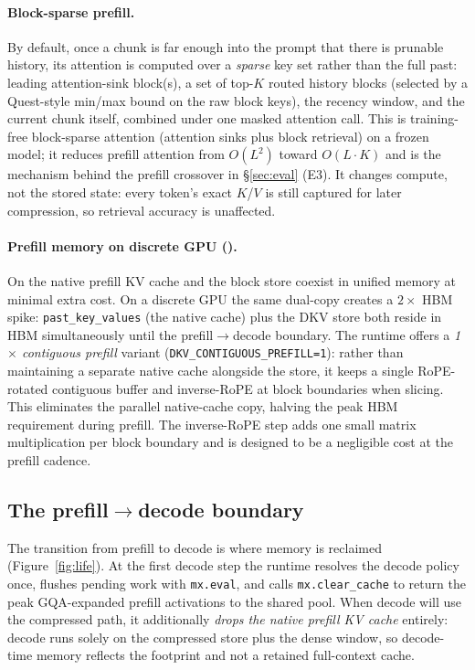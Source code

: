 \paragraph{Block-sparse prefill.} By default, once a chunk is far enough into the prompt that
there is prunable history, its attention is computed over a \emph{sparse} key set rather than the
full past: leading attention-sink block(s), a set of top-$K$ routed history blocks (selected by a
Quest-style min/max bound on the raw block keys), the recency window, and the current chunk itself,
combined under one masked attention call. This is training-free block-sparse attention
(attention sinks plus block retrieval) on a frozen model; it reduces prefill attention from
$O(L^2)$ toward $O(L\cdot K)$ and is the mechanism behind the prefill crossover in
\S\ref{sec:eval} (E3). It changes compute, not the stored state: every token's exact $K$/$V$ is
still captured for later compression, so retrieval accuracy is unaffected.

\paragraph{Prefill memory on discrete GPU (\cuda{}).}
On \mlxe{} the native prefill KV cache and the \dkv{} block store coexist in unified memory
at minimal extra cost. On a discrete GPU the same dual-copy creates a $2\times$ HBM spike:
\texttt{past\_key\_values} (the native cache) plus the DKV store both reside in HBM
simultaneously until the prefill$\to$decode boundary. The \cuda{} runtime offers a
\emph{1$\times$ contiguous prefill} variant (\texttt{DKV\_CONTIGUOUS\_PREFILL=1}): rather than
maintaining a separate native cache alongside the store, it keeps a single RoPE-rotated
contiguous buffer and inverse-RoPE at block boundaries when slicing. This eliminates the parallel
native-cache copy, halving the peak HBM requirement during prefill. The inverse-RoPE step adds
one small matrix multiplication per block boundary and is designed to be a negligible cost at
the prefill cadence.

\subsection{The prefill$\to$decode boundary}
The transition from prefill to decode is where memory is reclaimed (Figure~\ref{fig:life}). At the
first decode step the runtime resolves the decode policy once, flushes pending work with
\texttt{mx.eval}, and calls \texttt{mx.clear\_cache} to return the peak GQA-expanded prefill
activations to the shared pool. When decode will use the compressed path, it additionally
\emph{drops the native prefill KV cache} entirely: decode runs solely on the compressed store plus
the dense window, so decode-time memory reflects the \dkv{} footprint and not a retained
full-context cache.

